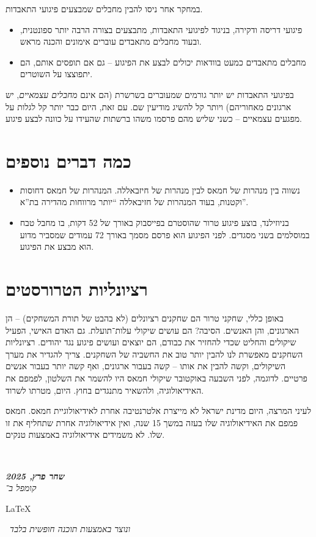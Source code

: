 \documentclass[]{article}
\newcommand\en[1] {\begin{otherlanguage}{english}#1\end{otherlanguage}}
\newcommand\ndoc  {\dotfill \\ \vfil {\begin{center}
			{\textbf{\textit{שחר פרץ, 2025}} \\
				\scriptsize \textit{קומפל ב־}\en{\LaTeX}\,\textit{ ונוצר באמצעות תוכנה חופשית בלבד}}
	\end{center}} \vfil	}
\begin{document}
	במחקר אחר ניסו להבין מחבלים שמבצעים פיגועי התאבדות. 
	\begin{itemize}
		\item פיגועי דריסה ודקירה, בניגוד לפיגועי התאבדות, מתבצעים בצורה הרבה יותר ספונטנית, ובעוד מחבלים מתאבדים עוברים אימונים והכנה מראש. 
		\item מחבלים מתאבדים כמעט בוודאות יכולים לבצע את הפיגוע – גם אם תופסים אותם, הם יתפוצצו על השוטרים. 
	\end{itemize}
	
	בפיגועי התאבדות יש יותר גורמים שמעוברים בשרשרת (הם אינם \textit{מחבלים עצמאיים}, יש ארגונים מאחוריהם) ויותר קל להשיג מודיעין שם. עם זאת, היום כבר יותר קל לגלות על מפגעים עצמאיים – כשני שליש מהם פרסמו משהו ברשתות שהעידו על כוונה לבצע פיגוע. 
	
	\section{כמה דברים נוספים}
	\begin{itemize}
		\item נשווה בין מנהרות של חמאס לבין מנהרות של חיזבאללה. המנהרות של חמאס דחוסות וקטנות, בעוד המנהרות של חזיבאללה ``יותר מרווחות מהדירה בת''א''. 
		\item בניוזילנד, בוצע פיגוע טרור שהוסטרם בפייסבוק באורך של 52 דקות, בו מחבל טבח במוסלמים בשני מסגדים. לפני הפיגוע הוא פרסם מסמך באורך 72 עמודים שמסביר מדוע הוא מבצע את הפיגוע. 
	\end{itemize}
	
	\section{רציונליות הטרורסטים}
	באופן כללי, שחקני טרור הם שחקנים רציונלים (לא בהבט של תורת המשחקים) – הן הארגונים, והן האנשים. הסיבה? הם עושים שיקולי עלות־תועלת. גם האדם האישי, הפעיל שיקולים והחליט שכדי להחזיר את כבודם, הם יוצאים ועושים פיגוע נגד יהודים. רציונליות השחקנים מאפשרת לנו להבין יותר טוב את החשביה של השחקנים. צריך להגדיר את מערך השיקולים, וקשה להבין את אותו – קשה בעבור ארגונים, ואף קשה יותר בעבור אנשים פרטיים. לדוגמה, לפני השבעה באוקטובר שיקולי חמאס היו להשמר את השלטון, לפמפם את האידיאולוגיה, ולהשאיר מתנגדים בחוץ. היום, מטרתו לשרוד. 
	
	לעיני המרצה, היום מדינת ישראל לא מייצרת אלטרנטיבה אחרת לאידיאולוגיית חמאס. חמאס פמפם את האידיאולוגיה שלו בעזה במשך 15 שנה, ואין אידיאולוגיה אחרת שתחליף את זו שלו. לא משמידים אידיאולוגיה באמצעות טנקים. 
	
	\ndoc
\end{document}
